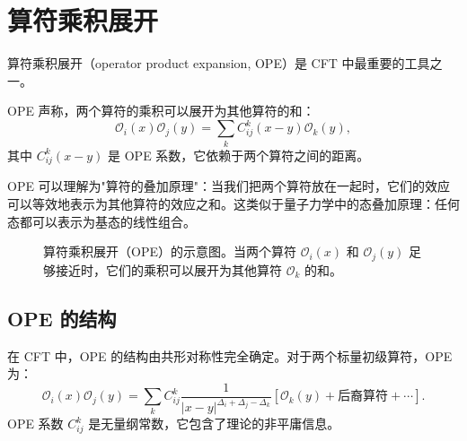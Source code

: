 \section{算符乘积展开}

算符乘积展开（operator product expansion, OPE）是 CFT 中最重要的工具之一。

\begin{definition}[算符乘积展开]
OPE 声称，两个算符的乘积可以展开为其他算符的和：
\begin{equation}
    \mathcal{O}_i(x) \mathcal{O}_j(y) = \sum_k C_{ij}^k(x-y) \mathcal{O}_k(y),
\end{equation}
其中 $C_{ij}^k(x-y)$ 是 OPE 系数，它依赖于两个算符之间的距离。
\end{definition}

\begin{note}[物理理解]
OPE 可以理解为"算符的叠加原理"：当我们把两个算符放在一起时，它们的效应可以等效地表示为其他算符的效应之和。这类似于量子力学中的态叠加原理：任何态都可以表示为基态的线性组合。
\end{note}

\begin{figure}[htbp]
\centering
{}
\caption{算符乘积展开（OPE）的示意图。当两个算符 $\mathcal{O}_i(x)$ 和 $\mathcal{O}_j(y)$ 足够接近时，它们的乘积可以展开为其他算符 $\mathcal{O}_k$ 的和。}
\label{fig:ope_diagram}
\end{figure}

\subsection{OPE 的结构}

\begin{theorem}
在 CFT 中，OPE 的结构由共形对称性完全确定。对于两个标量初级算符，OPE 为：
\begin{equation}
    \mathcal{O}_i(x) \mathcal{O}_j(y) = \sum_k C_{ij}^k \frac{1}{|x-y|^{\Delta_i+\Delta_j-\Delta_k}} \left[ \mathcal{O}_k(y) + \text{后裔算符} + \cdots \right].
\end{equation}
OPE 系数 $C_{ij}^k$ 是无量纲常数，它包含了理论的非平庸信息。
\end{theorem}

